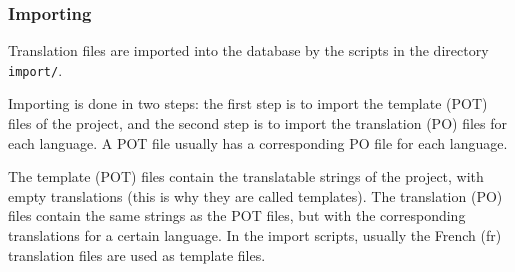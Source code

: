 \documentclass[11pt]{article}
\begin{document}
\subsubsection{Importing}
\label{sec-8.4.2}


    Translation files are imported into the database by the scripts in
    the directory \texttt{import/}.

    Importing is done in two steps: the first step is to import the
    template (POT) files of the project, and the second step is to
    import the translation (PO) files for each language.  A POT file
    usually has a corresponding PO file for each language.

    The template (POT) files contain the translatable strings of the
    project, with empty translations (this is why they are called
    templates). The translation (PO) files contain the same strings
    as the POT files, but with the corresponding translations for a
    certain language. In the import scripts, usually the French (fr)
    translation files are used as template files.
\end{document}
